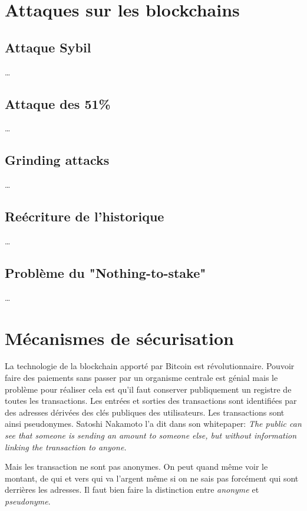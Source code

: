 \section{Attaques sur les blockchains}

\subsection{Attaque Sybil}

\dots

\subsection{Attaque des 51\%}

\dots

\subsection{Grinding attacks}

\dots

\subsection{Reécriture de l'historique}

\dots

\subsection{Problème du "Nothing-to-stake"}

\dots

\section{Mécanismes de sécurisation}

La technologie de la blockchain apporté par Bitcoin est révolutionnaire. Pouvoir faire des paiements sans passer par un organisme centrale est génial mais le problème pour réaliser cela est qu'il faut conserver publiquement un registre de toutes les transactions. Les entrées et sorties des transactions sont identifiées par des adresses dérivées des clés publiques des utilisateurs. Les transactions sont ainsi pseudonymes. Satoshi Nakamoto l'a dit dans son whitepaper: \textit{The public can see that someone is sending an amount to someone else, but without information linking the transaction to anyone.}

Mais les transaction ne sont pas anonymes. On peut quand même voir le montant, de qui et vers qui va l'argent même si on ne sais pas forcément qui sont derrières les adresses. Il faut bien faire la distinction entre \emph{anonyme} et \emph{pseudonyme}.

